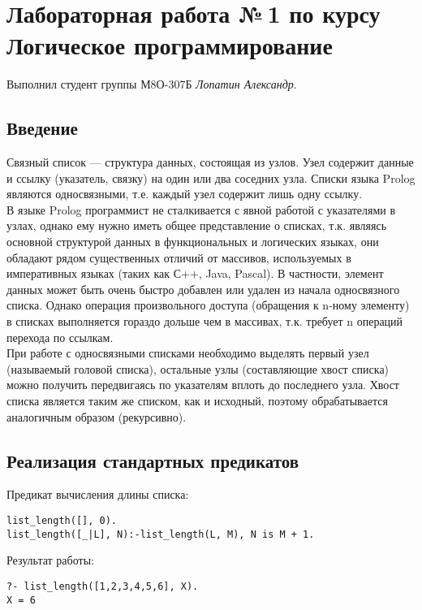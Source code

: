 \documentclass[12pt]{article}
\begin{document}
\section*{Лабораторная работа №\,1 по курсу Логическое программирование}

Выполнил студент группы М8О-307Б \textit{Лопатин Александр}.

\subsection*{Введение}
Связный список — структура данных, состоящая из узлов. Узел содержит данные и ссылку (указатель, связку) на один или два соседних узла. Списки языка Prolog являются односвязными, т.е. каждый узел содержит лишь одну ссылку.\\

В языке Prolog программист не сталкивается с явной работой с указателями в узлах, однако ему нужно иметь общее представление о списках, т.к. являясь основной структурой данных в функциональных и логических языках, они обладают рядом существенных отличий от массивов, используемых в императивных языках (таких как С++, Java, Pascal). В частности, элемент данных может быть очень быстро добавлен или удален из начала односвязного списка. Однако операция произвольного доступа (обращения к n-ному элементу) в списках выполняется гораздо дольше чем в массивах, т.к. требует n операций перехода по ссылкам.\\

При работе с односвязными списками необходимо выделять первый узел (называемый головой списка), остальные узлы (составляющие хвост списка) можно получить передвигаясь по указателям вплоть до последнего узла. Хвост списка является таким же списком, как и исходный, поэтому обрабатывается аналогичным образом (рекурсивно).\\


\subsection*{Реализация стандартных предикатов}
Предикат вычисления длины списка:
\begin{lstlisting}
list_length([], 0).
list_length([_|L], N):-list_length(L, M), N is M + 1.
\end{lstlisting}
Результат работы:
\begin{lstlisting}
?- list_length([1,2,3,4,5,6], X).
X = 6
\end{lstlisting}
\end{document}
